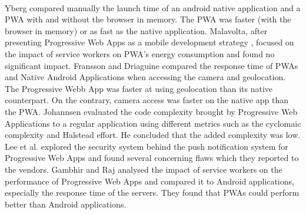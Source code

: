 \documentclass{kththesis}
\begin{document}
\paragraph{}
Yberg \cite{YbergViktor2018NPaU} compared manually the launch time of an android native application and a PWA with and without the browser in memory. The PWA was faster (with the browser in memory) or as fast as the native application. \newline
Malavolta, after presenting Progressive Web Apps as a mobile development strategy \cite{malavolta2016beyond}, focused on the impact of service workers on PWA's energy consumption and found no significant impact\cite{SW_and_energy}. \newline
Fransson and Driaguine \cite{PWAbc_responsetime} compared the response time of PWAs and Native Android Applications when accessing the camera and geolocation. The Progressive Webb App was faster at using geolocation than its native counterpart. On the contrary, camera access was faster on the native app than the PWA. \newline
Johannsen \cite{JohannsenFabian2018PWAa} evaluated the code complexity brought by Progressive Web Applications to a regular application using different metrics such as the cyclomaic complexity and Halstead effort. He concluded that the added complexity was low. \newline
Lee et al. \cite{Pride_Prejudice} explored the security system behind the push notification system for Progressive Web Apps and found several concerning flaws which they reported to the vendors. \newline
Gambhir and Raj \cite{gambhir2018analysis} analysed the impact of service workers on the performance of Progressive Web Apps and compared it to Android applications, especially the response time of the servers. They found that PWAs could perform better than Android applications. \newline
\end{document}
